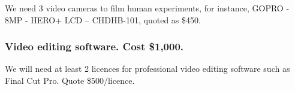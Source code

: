 \documentclass[a4paper,fontsize=12pt]{scrartcl}
\begin{document}
We need 3 video cameras to film human experiments, for instance, GOPRO - 8MP - HERO+ LCD – CHDHB-101, quoted as \$450. 

\subsubsection*{Video editing software. Cost \$1,000.}

We will need at least 2 licences for professional video editing software such as Final Cut Pro. Quote \$500/licence. 
\end{document}
